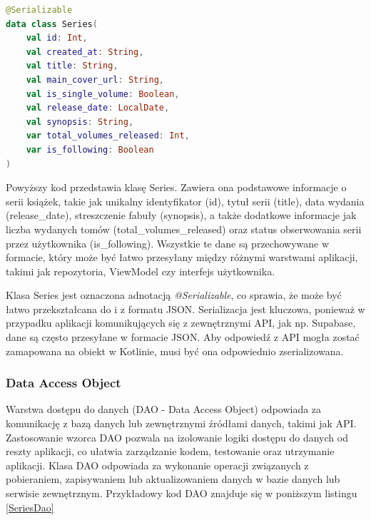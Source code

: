 \documentclass[12pt,twoside]{article}
\begin{document}
\begin{lstlisting}[language=Kotlin,caption=Data Transfer Object Series, label={SeriesDTO}]
@Serializable
data class Series(
    val id: Int,
    val created_at: String,
    val title: String,
    val main_cover_url: String,
    val is_single_volume: Boolean,
    val release_date: LocalDate,
    val synopsis: String,
    var total_volumes_released: Int,
    var is_following: Boolean
)
\end{lstlisting}
Powyższy kod przedstawia klasę Series. Zawiera ona podstawowe informacje o serii książek, takie jak unikalny 
identyfikator (id), tytuł serii (title), data wydania (release\_date), streszczenie fabuły (synopsis), a także 
dodatkowe informacje jak liczba wydanych tomów (total\_volumes\_released) oraz status obserwowania serii przez 
użytkownika (is\_following). Wszystkie te dane są przechowywane w formacie, który może być łatwo przesyłany między 
różnymi warstwami aplikacji, takimi jak repozytoria, ViewModel czy interfejs użytkownika.

Klasa Series jest oznaczona adnotacją \textit{@Serializable}, co sprawia, że może być łatwo przekształcana do i z formatu 
JSON. Serializacja jest kluczowa, ponieważ w przypadku aplikacji komunikujących się z zewnętrznymi API, jak np. 
Supabase, dane są często przesyłane w formacie JSON. Aby odpowiedź z API mogła zostać zamapowana na obiekt w 
Kotlinie, musi być ona odpowiednio zserializowana.

\subsubsection{Data Access Object}
Warstwa dostępu do danych (DAO - Data Access Object) odpowiada za komunikację z bazą danych lub zewnętrznymi 
źródłami danych, takimi jak API. Zastosowanie wzorca DAO pozwala na izolowanie logiki dostępu do danych od reszty 
aplikacji, co ułatwia zarządzanie kodem, testowanie oraz utrzymanie aplikacji. Klasa DAO odpowiada za wykonanie 
operacji związanych z pobieraniem, zapisywaniem lub aktualizowaniem danych w bazie danych lub serwisie zewnętrznym.
Przykładowy kod DAO znajduje się w poniższym listingu \ref{SeriesDao}
\end{document}

